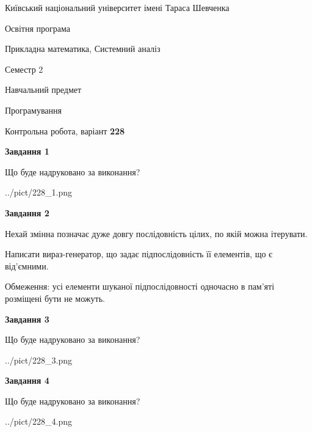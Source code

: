 \documentclass[12pt, ukrainian]{article}
\begin{document}
{{\begin {small}\par
{ \center  Київський національний університет імені Тараса Шевченка \par}
{\parbox {5 cm}{Освітня програма \hfill}{\parbox {8 cm}{Прикладна математика, Системний аналіз \hfill}}\parbox {5 cm}{\hfill Семестр 2}}\par
{\parbox {5 cm} {Навчальний предмет \hfill}\parbox {7 cm}{Програмування \hfill}\parbox {6cm}{\hfill}\par}\vspace{-7pt} \end{small}}{\center Контрольна робота, варіант  \No \textbf
{ 228 }\par}}
{
\begin {large}
{\begin {center}\textbf{Завдання 1}\end {center}}\par
Що буде надруковано за виконання?\par\par
\begin{center}
	{../pict/228_1.png}
\end{center}
\newpage

{\begin {center}\textbf{Завдання 2}\end {center}}\par
Нехай змінна  позначає дуже довгу послідовність цілих, по якій можна ітерувати.

Написати вираз-генератор, що задає підпослідовність її елементів, що є від'єм\-ни\-ми.

Обмеження: усі елементи шуканої підпослідовності одночасно в пам'яті розміщені бути не можуть.\par
\newpage

{\begin {center}\textbf{Завдання 3}\end {center}}\par
Що буде надруковано за виконання?\par
\begin{center}
	{../pict/228_3.png}
\end{center}
\newpage

{\begin {center}\textbf{Завдання 4}\end {center}}\par
Що буде надруковано за виконання?\par
\begin{center}
	{../pict/228_4.png}
\end{center}
\newpage


\end{large}}
\end{document}

